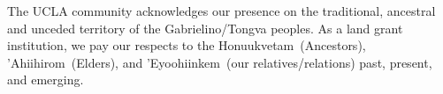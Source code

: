 
\vspace*{\fill}
\begin{center}
    \begin{minipage}{\linewidth}
        The UCLA community acknowledges our presence on the traditional, ancestral and unceded territory of the Gabrielino/Tongva peoples.
        As a land grant institution, we pay our respects to the Honuukvetam~(Ancestors), 'Ahiihirom~(Elders), and 'Eyoohiinkem~(our relatives/relations) past, present, and emerging.
    \end{minipage}
\end{center}
\vspace*{\fill}
